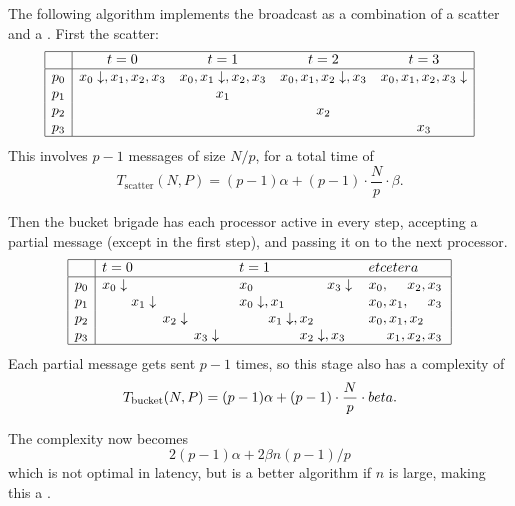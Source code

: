 The following algorithm implements the broadcast as a combination of a scatter
and a . First the scatter:
\[
\begin{array}{|c|cccc|}
\hline
  &t=0&t=1&t=2&t=3\\ \hline
  p_0&x_0\downarrow,x_1,x_2,x_3 %
  &x_0,x_1\downarrow,x_2,x_3 %
   &x_0,x_1,x_2\downarrow,x_3 %
  &x_0,x_1,x_2,x_3\downarrow %
  \\
  p_1& %
  &x_1&&\\
  p_2&& %
  &x_2&\\
  p_3&&& %
  &x_3\\
\hline
\end{array}
\]
This involves $p-1$ messages of size $N/p$, for a total time of
\[ T_{\scriptstyle\mathrm{scatter}}(N,P) = (p-1)\alpha +
(p-1)\cdot\frac{N}{p}\cdot \beta.
\]

Then the bucket brigade has each processor active in every step,
accepting a partial message (except in the first step), and passing it
on to the next processor.
\[
\begin{array}{|c|lll|}
\hline
  &t=0&t=1&et cetera\\ \hline
p_0&x_0\downarrow\hphantom{,x_1\downarrow,x_2\downarrow,x_3\downarrow}
   &x_0\hphantom{\downarrow,x_1\downarrow,x_2\downarrow,}x_3\downarrow
   &x_0,\hphantom{x_1,}x_2,x_3\\
p_1&\hphantom{x_0\downarrow,}x_1\downarrow\hphantom{,x_2\downarrow,x_3\downarrow}
   &x_0\downarrow,x_1\hphantom{\downarrow,x_2\downarrow,x_3\downarrow}
   &x_0,x_1,\hphantom{x_2,}x_3\\
p_2&\hphantom{x_0\downarrow,x_1\downarrow,}x_2\downarrow\hphantom{,x_3\downarrow}
   &\hphantom{x_0\downarrow,}x_1\downarrow,x_2\hphantom{\downarrow,x_3\downarrow}
   &x_0,x_1,x_2\hphantom{,x_3}\\
p_3&\hphantom{x_0\downarrow,x_1\downarrow,x_2\downarrow,}x_3\downarrow
   &\hphantom{x_0\downarrow,x_1\downarrow,}x_2\downarrow,x_3\hphantom{\downarrow}
   &\hphantom{x_0,}x_1,x_2,x_3\\
\hline
\end{array}
\]
Each partial message gets sent $p-1$ times, so this stage also has a
complexity of 
\[ T_{\scriptsize\mathrm{bucket}}(N,P) = (p-1)\alpha +
(p-1)\cdot\frac{N}{p}\cdot beta.
\]

The complexity now becomes \[ 2(p-1)\alpha+2\beta n(p-1)/p \]
which is not optimal in latency, but is a better algorithm if $n$ is large,
making this a .

